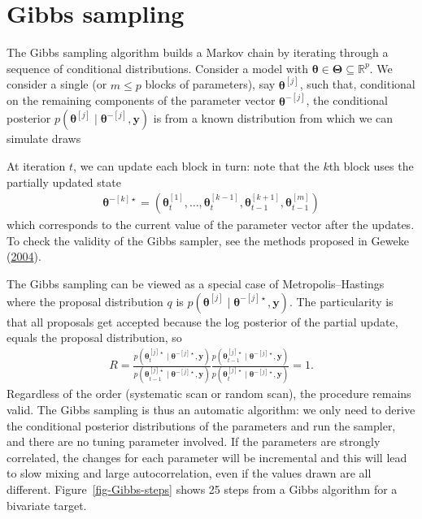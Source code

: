 \documentclass[
  11pt,
  letterpaper,
]{scrbook}
\theoremstyle{definition}
\theoremstyle{definition}
\theoremstyle{definition}
\theoremstyle{plain}
\theoremstyle{remark}
\begin{document}
\hypertarget{gibbs-sampling}{%
\section{Gibbs sampling}\label{gibbs-sampling}}

The Gibbs sampling algorithm builds a Markov chain by iterating through
a sequence of conditional distributions. Consider a model with
\(\boldsymbol{\theta} \in \boldsymbol{\Theta} \subseteq \mathbb{R}^p\).
We consider a single (or \(m \leq p\) blocks of parameters), say
\(\boldsymbol{\theta}^{[j]}\), such that, conditional on the remaining
components of the parameter vector \(\boldsymbol{\theta}^{-[j]}\), the
conditional posterior
\(p(\boldsymbol{\theta}^{[j]} \mid \boldsymbol{\theta}^{-[j]}, \boldsymbol{y})\)
is from a known distribution from which we can simulate draws

At iteration \(t\), we can update each block in turn: note that the
\(k\)th block uses the partially updated state \begin{align*}
\boldsymbol{\theta}^{-[k]\star} = (\boldsymbol{\theta}_{t}^{[1]}, \ldots, \boldsymbol{\theta}_{t}^{[k-1]},\boldsymbol{\theta}_{t-1}^{[k+1]}, \boldsymbol{\theta}_{t-1}^{[m]})
\end{align*} which corresponds to the current value of the parameter
vector after the updates. To check the validity of the Gibbs sampler,
see the methods proposed in Geweke
(\protect\hyperlink{ref-Geweke:2004}{2004}).

The Gibbs sampling can be viewed as a special case of
Metropolis--Hastings where the proposal distribution \(q\) is
\(p(\boldsymbol{\theta}^{[j]} \mid \boldsymbol{\theta}^{-[j]\star}, \boldsymbol{y})\).
The particularity is that all proposals get accepted because the log
posterior of the partial update, equals the proposal distribution, so
\begin{align*}
R = \frac{p(\boldsymbol{\theta}_t^{[j]\star} \mid \boldsymbol{\theta}^{-[j]\star}, \boldsymbol{y})}{p(\boldsymbol{\theta}_{t-1}^{[j]\star} \mid \boldsymbol{\theta}^{-[j]\star}, \boldsymbol{y})}\frac{p(\boldsymbol{\theta}_{t-1}^{[j]\star} \mid \boldsymbol{\theta}^{-[j]\star}, \boldsymbol{y})}{p(\boldsymbol{\theta}_t^{[j]\star} \mid \boldsymbol{\theta}^{-[j]\star}, \boldsymbol{y})}=1.
\end{align*} Regardless of the order (systematic scan or random scan),
the procedure remains valid. The Gibbs sampling is thus an automatic
algorithm: we only need to derive the conditional posterior
distributions of the parameters and run the sampler, and there are no
tuning parameter involved. If the parameters are strongly correlated,
the changes for each parameter will be incremental and this will lead to
slow mixing and large autocorrelation, even if the values drawn are all
different. Figure~\ref{fig-Gibbs-steps} shows 25 steps from a Gibbs
algorithm for a bivariate target.
\end{document}

